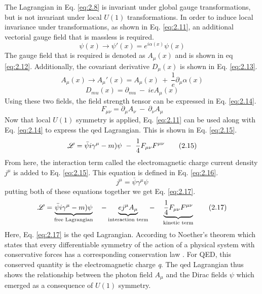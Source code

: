 %
The Lagrangian in Eq. \ref{eq:2.8} is invariant under global gauge transformations, but is 
not invariant under local $U(1)$ transformations. In order to induce local invariance under transformations,
as shown in Eq. \ref{eq:2.11}, an additional vectorial gauge field that is massless is required.
%
\begin{equation}\label{eq:2.11}
    \psi(x) \rightarrow \psi'(x) = e^{i\alpha(x)}\psi(x)  
\tag{2.11}
\end{equation}
%
The gauge field that is required is denoted as $A_{\mu}(x)$ and is shown in eq \ref{eq:2.12}.
Additionally, the covariant derivative $D_{\mu}(x)$ is shown in Eq. \ref{eq:2.13}.
%
\begin{equation}\label{eq:2.12}
    A_{\mu}(x) \rightarrow A_{\mu}'(x) = A_{\mu}(x) \ + \ \frac{1}e\partial_{\mu}\alpha(x)
\tag{2.12}    
\end{equation}
%
\begin{equation}\label{eq:2.13}
    D_{mu}(x) = \partial_{mu} \ - \ ieA_{\mu}(x)
\tag{2.13}
\end{equation}
%
Using these two fields, the field strength tensor can be expressed in Eq. \ref{eq:2.14}.
%
\begin{equation}\label{eq:2.14}
    F_{\mu\nu} = \partial_{\mu}A_{\nu} \ - \ \partial_{\nu}A_{\mu}
\tag{2.14} 
\end{equation}
%
Now that local $U(1)$ symmetry is applied, Eq. \ref{eq:2.11} can be used along with Eq. \ref{eq:2.14}
to express the \gls{qed} Lagrangian. This is shown in Eq. \ref{eq:2.15}.
%
\begin{equation}\label{eq:2.15}
    \Lagr = \bar{\psi}i\gamma^{\mu}-m)\psi \ - \ \frac{1}4F_{\mu\nu}F^{\mu\nu}
\tag{2.15}
\end{equation}
%
From here, the interaction term called the electromagnetic charge current density $j^{\mu}$
is added to Eq. \ref{eq:2.15}. This equation is defined in Eq. \ref{eq:2.16}. 
%
\begin{equation}\label{eq:2.16}
    j^{\mu} = \bar{\psi}\gamma^{\mu}\psi
\tag{2.16}
\end{equation}
%
putting both of these equations together we get Eq. \ref{eq:2.17}.
%
\begin{equation}\label{eq:2.17}
    \mathscr{L} = \underbrace{\bar{\psi}i\gamma^{\mu}-m)\psi}_\text{free Lagrangian} \ \ \ -  \underbrace{ej^{\mu}A_{\mu}}_\text{interaction term}  - \ \ \ \underbrace{\frac{1}4F_{\mu\nu}F^{\mu\nu}}_\text{kinetic term}
\tag{2.17}
\end{equation}
%
Here, Eq. \ref{eq:2.17} is the \gls{qed} Lagrangian. According to Noether's theorem which states 
that every differentiable symmetry of the action of a physical system with conservative forces has
a corresponding conservation law \cite{noether}. For QED, this conserved quantity is the electromagnetic 
charge \textit{q}. The \gls{qed} Lagrangian thus shows the relationship between the photon field $A_{\mu}$ 
and the Dirac fields $\psi$ which emerged as a consequence of $U(1)$ symmetry.
%

